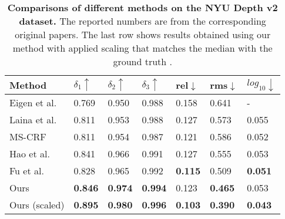 \documentclass[10pt,twocolumn,letterpaper]{article}
\begin{document}
\begin{table*}[t]
\centering
\begin{tabular}{l|lll|lll}
\toprule
Method         & $\delta_{1}\uparrow$ & $\delta_{2}\uparrow$ & $\delta_{3}\uparrow$ & rel$\downarrow$   & rms$\downarrow$   & $log_{10}\downarrow$  \\ 
\midrule
Eigen et al. \cite{Eigen2014}    & 0.769  & 0.950  & 0.988 & 0.158 & 0.641 & -   \\
Laina et al. \cite{Laina2016}    & 0.811  & 0.953  & 0.988 & 0.127 & 0.573 & 0.055   \\
MS-CRF \cite{Xu2017}             & 0.811  & 0.954  & 0.987 & 0.121 & 0.586 & 0.052   \\
Hao et al. \cite{Hao2018DetailPD}& 0.841  & 0.966  & 0.991 & 0.127 & 0.555 & 0.053   \\
Fu et al. \cite{Fu2018DeepOR}    & 0.828  & 0.965  & 0.992 & \textbf{0.115} & 0.509 & \textbf{0.051}   \\
Ours                   & \textbf{0.846}  &  \textbf{0.974}  &  \textbf{0.994} &  0.123  &  \textbf{0.465} &  0.053   \\
\midrule
Ours (scaled)      & \textbf{0.895}  &  \textbf{0.980}  &  \textbf{0.996} &  \textbf{0.103}  &  \textbf{0.390} &  \textbf{0.043}   \\
\bottomrule
\end{tabular}
\bigskip
\caption{\textbf{Comparisons of different methods on the NYU Depth v2 dataset.} The reported numbers are from the corresponding original papers. The last row shows results obtained using our method with applied scaling that matches the median with the ground truth \cite{Zhou2017}. }
\label{tab:1}
\end{table*}
\end{document}
